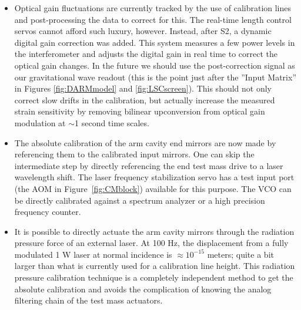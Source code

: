 \begin{itemize}
\item Optical gain fluctuations are currently tracked by the use of
      calibration lines and post-processing the data to correct for this. The
      real-time length control servos cannot afford such luxury, however.
      Instead, after S2, a dynamic digital gain correction was added. This
      system measures a few power levels in the interferometer and adjusts
      the digital gain in real time to correct the optical gain changes. In
      the future we should use the post-correction signal as our gravitational wave readout
      (this is the point just after the ''Input Matrix'' in Figures
       \ref{fig:DARMmodel} and \ref{fig:LSCscreen}).
      This should not only correct slow drifts in the calibration, but actually
      increase the measured strain sensitivity by removing bilinear upconversion
      from optical gain modulation at $\sim$1 second time scales.

\item The absolute calibration of the arm cavity end mirrors are now made by
      referencing them to the calibrated input mirrors. One can skip the
      intermediate step by directly referencing the end test mass drive
      to a laser wavelength shift. The laser frequency stabilization servo
      has a test input port (the AOM in Figure~\ref{fig:CMblock}) available
      for this purpose. The VCO can be directly calibrated against a spectrum
      analyzer or a high precision frequency counter.

\item It is possible to directly actuate the arm cavity mirrors through
      the radiation pressure force of an external laser. At 100 Hz, the
      displacement from a fully modulated 1 W laser at normal
      incidence is $\approx10^{-15}$ meters; quite a bit larger than
      what is currently used for a calibration line height. This radiation
      pressure calibration technique is a completely independent method to
      get the absolute calibration and avoids the complication of knowing 
      the analog filtering chain of the test mass actuators.
\end{itemize}





